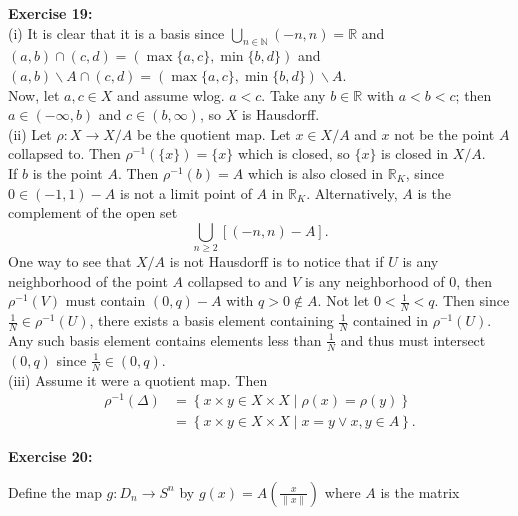 \documentclass[a4paper]{article}
\begin{document}
        \textbf{Exercise 19:} \\
        (i) It is clear that it is a basis since
        $\bigcup_{n \in \mathbb{N}} (-n,n) = \mathbb{R}$ and
        $(a,b) \cap (c,d) = \left( \max\{a,c\}, \min\{b,d\} \right) $ and
        $(a,b) \backslash A \cap (c,d) = \left( \max\{a,c\}, \min\{b,d\}
        \right) \backslash A$.\\
        Now, let $a,c \in X$ and assume wlog. $a<c$. Take any $b \in
        \mathbb{R}$ with $a<b<c$; then
        $a \in (-\infty, b)$ and $c \in (b, \infty)$, so $X$ is Hausdorff.\\
        \linebreak
        (ii) Let $\rho  \colon X \to X /A$ be the quotient map. Let $x \in X /A$ 
        and $x$ not be the point $A$ collapsed to. Then $\rho^{-1}\left( \{x\} \right) 
        = \{x\}$ which is closed, so $\{x\}$ is closed in $X / A$.\\
        If $b$ is the point $A$. Then $\rho^{-1} (b) = A$ which is also closed
        in $\mathbb{R}_{K}$, since $0 \in (-1,1) -A$ is not a limit point of
        $A$ in $\mathbb{R}_{K}$. Alternatively, $A$ is the complement of the
        open set
        \[
        \bigcup_{n \ge 2} \left[ \left( -n, n \right) -A \right]
        .\] 
        One way to see that $X /A$ is not Hausdorff is to notice that if
        $U$ is any neighborhood of the point $A$ collapsed to and $V$ is any
        neighborhood of $0$, then $\rho^{-1} (V)$ must contain 
        $(0,q) -A$ 
        with $q>0 \not\in A$. Not let  $0 < \frac{1}{N} < q$. Then
        since $\frac{1}{N} \in \rho^{-1}(U)$, there exists a basis element
        containing $\frac{1}{N}$ contained in $\rho^{-1}(U)$. Any such basis
        element contains elements less than $\frac{1}{N}$ and thus must
        intersect
        $(0,q)$ since $\frac{1}{N} \in (0,q)$.\\
        \linebreak
        (iii) Assume it were a quotient map. Then
        \begin{align*}
            \rho^{-1} \left( \Delta \right)
            &= \left\{ x \times y \in X \times X  \mid \rho (x) = \rho(y)
            \right\} \\
            &= \left\{ x \times y \in X \times X  \mid x =y \lor x,y \in A \right\} 
        .\end{align*}

        \textbf{Exercise 20:}

        Define the map $g  \colon D_n \to S^{n}$ by
        $g (x) = A \left( \frac{x}{\|x\|}\right) $ where
        $A$ is the matrix
\end{document}
